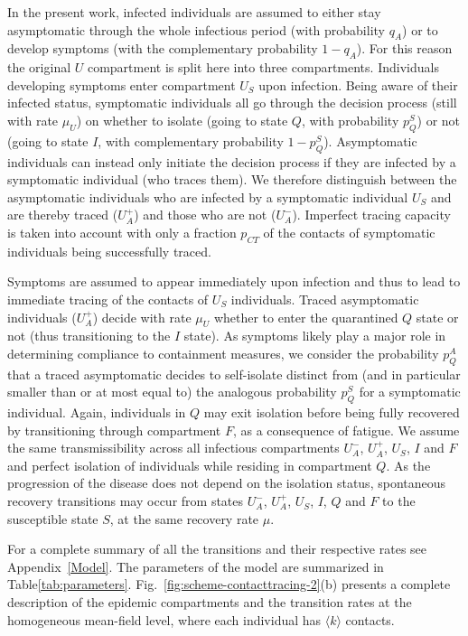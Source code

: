 \documentclass[aps,twocolumn,superscriptaddress,nofootinbib,pre,floatfix]{revtex4-1}
\begin{document}
In the present work, infected individuals are assumed to either stay
asymptomatic through the whole infectious period (with probability
$q_A$) or to develop symptoms (with the complementary probability $1-q_A$).
For this reason the original $U$ compartment is split here into three
compartments.
Individuals developing symptoms enter compartment $U_S$ upon infection.
Being aware of their infected status, symptomatic individuals all go
through the decision process (still with rate $\mu_U$)
on whether to isolate (going to state $Q$, with probability $p_Q^S$)
or not (going to state $I$, with complementary probability $1-p_Q^S$).
Asymptomatic individuals can instead only initiate the decision
process if they are infected by a symptomatic individual (who traces them).
We therefore distinguish
between the asymptomatic individuals who are infected by a
symptomatic individual $U_S$ and are thereby traced ($U_A^+$)
and those who are not ($U_A^-$).
Imperfect tracing capacity is taken into account with
only a fraction $p_{CT}$ of the contacts of symptomatic individuals being successfully traced.


Symptoms are assumed to appear immediately upon infection and thus to
lead to immediate tracing of the contacts of $U_S$ individuals.
Traced asymptomatic individuals ($U_A^+$) decide with rate $\mu_U$
whether to enter the quarantined $Q$ state or not
(thus transitioning to the $I$ state).
As symptoms likely play a major role in determining compliance to
containment measures, we consider the probability
$p_Q^A$ that a traced asymptomatic decides to self-isolate distinct
from (and in particular smaller than or at most equal to) the analogous
probability $p_Q^S$ for a symptomatic individual.
Again, individuals in $Q$ may exit isolation before being fully
recovered by transitioning through compartment $F$, as a consequence
of fatigue.
We assume the same transmissibility across all infectious compartments
$U_A^-$, $U_A^+$, $U_S$, $I$ and $F$ and perfect isolation of
individuals while residing in compartment $Q$.
As the progression of the disease does not depend on the isolation
status, spontaneous recovery transitions may occur from states $U_A^-$,
$U_A^+$, $U_S$, $I$, $Q$ and $F$ to the susceptible state $S$, at the same
recovery rate $\mu$.

For a complete summary of all the transitions and their respective rates
see Appendix~\ref{Model}. The parameters of the model are summarized in Table\ref{tab:parameters}.
Fig.~\ref{fig:scheme-contacttracing-2}(b) presents a complete
description of the epidemic compartments and the transition
rates at the homogeneous mean-field level, where each individual has
$\langle k \rangle$ contacts.
\end{document}
